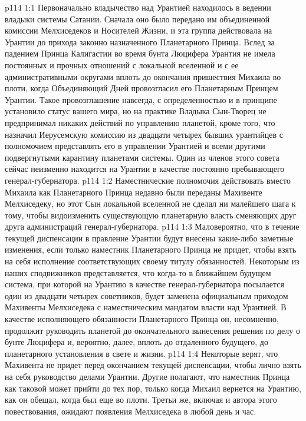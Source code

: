 \vs p114 1:1 Первоначально владычество над Урантией находилось в ведении владыки системы Сатании. Сначала оно было передано им объединенной комиссии Мелхиседеков и Носителей Жизни, и эта группа действовала на Урантии до прихода законно назначенного Планетарного Принца. Вслед за падением Принца Калигастии во время бунта Люцифера Урантия не имела постоянных и прочных отношений с локальной вселенной и с ее административными округами вплоть до окончания пришествия Михаила во плоти, когда Объединяющий Дней провозгласил его Планетарным Принцем Урантии. Такое провозглашение навсегда, с определенностью и в принципе установило статус вашего мира, но на практике Владыка Сын\hyp{}Творец не предпринимал никаких действий по управлению планетой, кроме того, что назначил Иерусемскую комиссию из двадцати четырех бывших урантийцев с полномочием представлять его в управлении Урантией и всеми другими подвергнутыми карантину планетами системы. Один из членов этого совета сейчас неизменно находится на Урантии в качестве постоянно пребывающего генерал\hyp{}губернатора.
\vs p114 1:2 Наместнические полномочия действовать вместо Михаила как Планетарного Принца недавно были переданы Махивенте Мелхиседеку, но этот Сын локальной вселенной не сделал ни малейшего шага к тому, чтобы видоизменить существующую планетарную власть сменяющих друг друга администраций генерал\hyp{}губернатора.
\vs p114 1:3 Маловероятно, что в течение текущей диспенсации в правление Урантии будут внесены какие\hyp{}либо заметные изменения, если только наместник Планетарного Принца не придет, чтобы взять на себя исполнение соответствующих своему титулу обязанностей. Некоторым из наших сподвижников представляется, что когда\hyp{}то в ближайшем будущем система, при которой на Урантию в качестве генерал\hyp{}губернатора посылается один из двадцати четырех советников, будет заменена официальным приходом Махивенты Мелхиседека с наместническим мандатом власти над Урантией. В качестве исполняющего обязанности Планетарного Принца он, несомненно, продолжит руководить планетой до окончательного вынесения решения по делу о бунте Люцифера и, вероятно, далее, вплоть до отдаленного будущего, до планетарного установления в свете и жизни.
\vs p114 1:4 Некоторые верят, что Махивента не придет перед окончанием текущей диспенсации, чтобы лично взять на себя руководство делами Урантии. Другие полагают, что наместник Принца как таковой может прийти до тех пор, только когда Михаил вернется на Урантию, как он обещал, когда был еще во плоти. Третьи же, включая и автора этого повествования, ожидают появления Мелхиседека в любой день и час.
